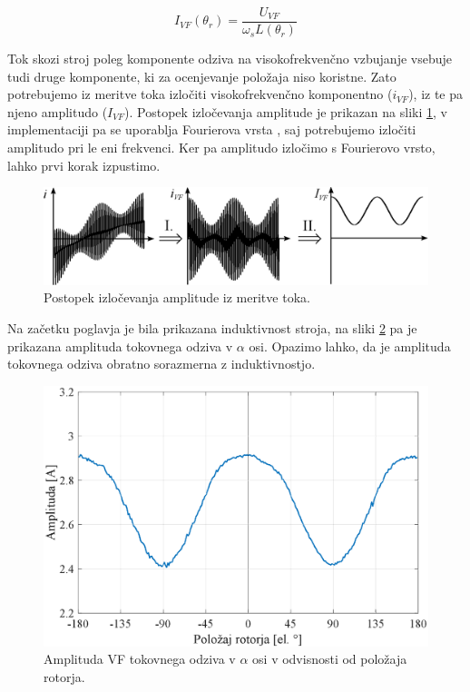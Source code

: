 \documentclass[a4paper,twoside,openright,12pt,slovene]{book}
\begin{document}
\begin{equation}
    I_{VF}(\theta_r) = \frac{U_{VF}}{\omega_sL(\theta_r)}
\end{equation}

Tok skozi stroj poleg komponente odziva na visokofrekvenčno vzbujanje vsebuje tudi druge komponente, ki za ocenjevanje položaja niso koristne. Zato potrebujemo iz meritve toka izločiti visokofrekvenčno 
komponentno ($i_{VF}$), iz te pa njeno amplitudo ($I_{VF}$). Postopek izločevanja amplitude je prikazan na sliki \ref{izlocevanjeAmplitude}, v implementaciji pa se uporablja Fourierova vrsta \cite{enwiki:fourierSeries},
saj potrebujemo izločiti amplitudo pri le eni frekvenci. Ker pa amplitudo izločimo s Fourierovo vrsto, lahko prvi korak izpustimo. 
\vfill
\begin{figure}[!htbp]
    \centering
    \includegraphics[width=1\columnwidth]{Slike/Inkscape/IzlocanjeAmplitude.eps}
    \caption{\label{izlocevanjeAmplitude} Postopek izločevanja amplitude iz meritve toka.}
\end{figure}
\vfill
\newpage

Na začetku poglavja je bila prikazana induktivnost stroja, na sliki \ref{tokovniOdzivAlpha} pa je prikazana amplituda tokovnega odziva v $\alpha$ osi. Opazimo lahko, da je amplituda tokovnega odziva 
obratno sorazmerna z induktivnostjo.

\begin{figure}[!htbp]
    \centering
    \includegraphics[width=0.99\columnwidth]{Slike/tokovniOdzivAlpha.eps}
    \caption{\label{tokovniOdzivAlpha} Amplituda VF tokovnega odziva v $\alpha$ osi v odvisnosti od položaja rotorja.}
\end{figure}
\end{document}
